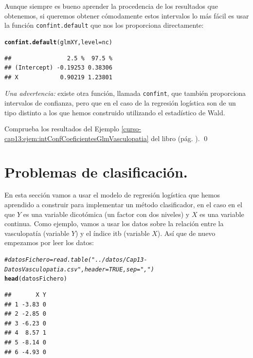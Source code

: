 \documentclass[10pt,a4paper]{article}\usepackage[]{graphicx}\usepackage[]{color}
\makeatletter
\newcommand{\hlcom}[1]{\textcolor[rgb]{0.678,0.584,0.686}{\textit{#1}}}%
\newcommand{\hlstd}[1]{\textcolor[rgb]{0.345,0.345,0.345}{#1}}%
\newcommand{\hlkwc}[1]{\textcolor[rgb]{0.333,0.667,0.333}{#1}}%
\newcommand{\hlkwd}[1]{\textcolor[rgb]{0.737,0.353,0.396}{\textbf{#1}}}%
\newenvironment{kframe}{%
 \def\at@end@of@kframe{}%
 \ifinner\ifhmode%
  \def\at@end@of@kframe{\end{minipage}}%
  \begin{minipage}{\columnwidth}%
 \fi\fi%
 \def\FrameCommand##1{\hskip\@totalleftmargin \hskip-\fboxsep
 \colorbox{shadecolor}{##1}\hskip-\fboxsep
     \hskip-\linewidth \hskip-\@totalleftmargin \hskip\columnwidth}%
 \MakeFramed {\advance\hsize-\width
   \@totalleftmargin\z@ \linewidth\hsize
   \@setminipage}}%
 {\par\unskip\endMakeFramed%
 \at@end@of@kframe}
\newenvironment{knitrout}{}{} %
\newcounter {cont01}
\makeatother
\begin{document}
Aunque siempre es bueno aprender la procedencia de los resultados que obtenemos, si queremos obtener cómodamente estos intervalos lo más fácil es usar la función {\tt confint.default} que nos los proporciona directamente:

\begin{knitrout}
\color{fgcolor}\begin{kframe}
\begin{alltt}
\hlkwd{confint.default}\hlstd{(glmXY,} \hlkwc{level} \hlstd{= nc)}
\end{alltt}
\begin{verbatim}
##                2.5 %  97.5 %
## (Intercept) -0.19253 0.38306
## X            0.90219 1.23801
\end{verbatim}
\end{kframe}
\end{knitrout}

{\em Una advertencia:} existe otra función, llamada {\tt confint}, que también proporciona intervalos de confianza, pero que en el caso de la regresión logística son de un tipo distinto a los que hemos construido utilizando el estadístico de Wald.

\begin{ejercicio}
\label{tut13:ejercicio08}
Comprueba los resultados del Ejemplo \ref{curso-cap13:ejem:intConfCoeficientesGlmVasculopatia} del libro (pág. \pageref{curso-cap13:ejem:intConfCoeficientesGlmVasculopatia}).
\qed
\end{ejercicio}


\section{Problemas de clasificación.}
\label{tut13:sec:ProblemasClasificacion}

En esta sección vamos a usar el modelo de regresión logística que hemos aprendido a construir para implementar un método clasificador, en el caso en el que $Y$ es una variable dicotómica (un factor con dos niveles) y $X$ es una variable continua. Como ejemplo, vamos a usar los datos sobre la relación entre la vasculopatía (variable $Y$) y el índice itb (variable $X$). Así que de nuevo empezamos por leer los datos:






\begin{knitrout}
\color{fgcolor}\begin{kframe}
\begin{alltt}
\hlcom{#datosFichero = read.table("../datos/Cap13-DatosVasculopatia.csv", header = TRUE, sep=",")}
\hlkwd{head}\hlstd{(datosFichero)}
\end{alltt}
\begin{verbatim}
##       X Y
## 1 -3.83 0
## 2 -2.85 0
## 3 -6.23 0
## 4  8.57 1
## 5 -8.14 0
## 6 -4.93 0
\end{verbatim}
\end{kframe}
\end{knitrout}
\end{document}
